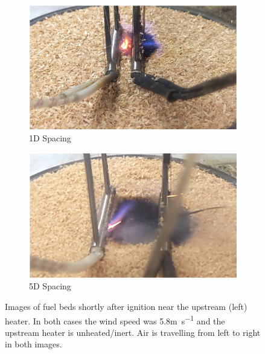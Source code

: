         \begin{figure}
            \centering
             \begin{subfigure}[b]{0.49\textwidth}
                \centering
                \includegraphics[width=\textwidth]{Figures/1DupstreamInert.png}
                \caption{1D Spacing}
                \label{subfig:1DunheatedImage}
            \end{subfigure}
            \begin{subfigure}[b]{0.49\textwidth}
                \centering
                \includegraphics[width=\textwidth]{Figures/5DupstreamInert.png}
                \caption{5D Spacing}
                \label{subfig:5DunheatedImage}
            \end{subfigure}
            \caption{Images of fuel beds shortly after ignition near the upstream (left) heater. In both cases the wind speed was 5.8\si{\meter\per\second} and the upstream heater is unheated/inert. Air is travelling from left to right in both images.}
            \label{fig:unheatedUpstreamIgnition}
        \end{figure}
